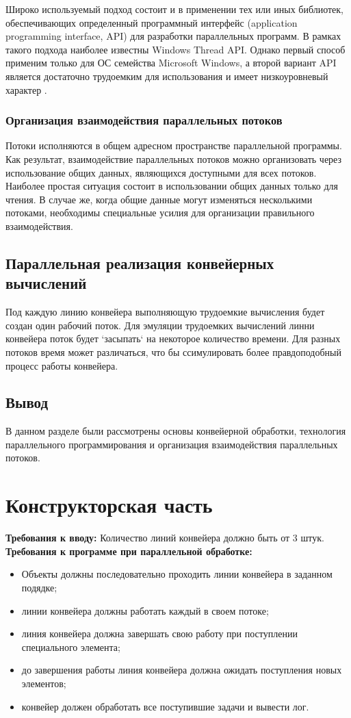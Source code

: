 \documentclass[12pt]{report}
\begin{document}
Широко используемый подход состоит и в применении тех или иных библиотек, обеспечивающих определенный программный интерфейс (application programming interface, API) для разработки параллельных программ. В рамках такого подхода наиболее известны Windows Thread API. Однако первый способ применим только для ОС семейства Microsoft Windows, а второй вариант API является достаточно трудоемким для использования и имеет низкоуровневый характер \cite{Barkalov}.

\subsection{Организация взаимодействия параллельных потоков}
Потоки исполняются в общем адресном пространстве параллельной программы. Как результат, взаимодействие параллельных потоков можно организовать через использование общих данных, являющихся доступными для всех потоков. Наиболее простая ситуация состоит в использовании общих данных только для чтения. В случае же, когда общие данные могут изменяться несколькими потоками, необходимы специальные усилия для организации правильного взаимодействия.

\section{Параллельная реализация конвейерных вычислений}
Под каждую линию конвейера выполняющую трудоемкие вычисления будет создан один рабочий поток. Для эмуляции трудоемких вычислений линни конвейера поток будет `засыпать`  на некоторое количество времени. Для разных потоков время может различаться, что бы ссимулировать более правдоподобный процесс работы конвейера.


\section{Вывод}
В данном разделе были рассмотрены основы конвейерной обработки, технология параллельного программирования и
организация взаимодействия параллельных потоков.



\chapter{Конструкторская часть}
\textbf{Требования к вводу:}
Количество линий конвейера должно быть от 3 штук.
\newline
\textbf{Требования к программе при параллельной обработке:}
\begin{itemize}
\item Объекты должны последовательно проходить линии конвейера в заданном подядке;
\item линии конвейера должны работать каждый в своем потоке;
\item линия конвейера должна завершать свою работу при поступлении специального элемента;
\item до завершения работы линия конвейера должна ожидать поступления новых элементов;
\item конвейер должен обработать все поступившие задачи и вывести лог.
\end{itemize}
\end{document}
